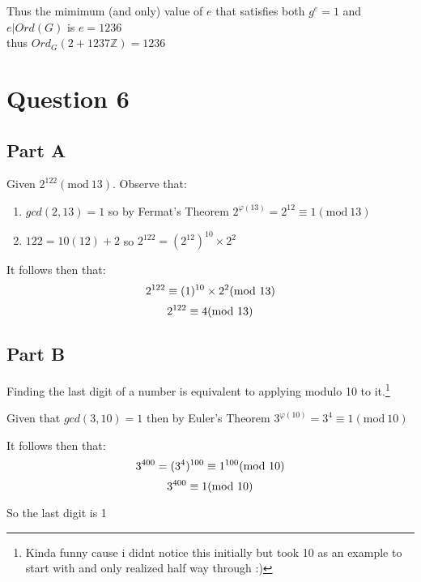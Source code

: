 \documentclass{article}
\numberwithin{equation}{subsection}
\begin{document}
\vspace{10pt}
Thus the mimimum (and only) value of $e$ that satisfies both $g^e=1$ and $e|Ord(G)$ is $e=1236$ \\thus $Ord_G(2+1237\mathbb{Z}) = 1236$ 

\newpage
	\thispagestyle{fancy}


	\section*{Question 6}
	\subsection*{Part A}
	Given $2^{122} (\textrm{mod}\ 13)$. Observe that:
	\begin{enumerate}
	\item $gcd(2, 13) =1$ so by Fermat's Theorem $2^{\varphi(13)} = 2^{12} \equiv 1 (\textrm{mod}\ 13)$
	\item $122 = 10(12) + 2$ \quad so \quad $2^{122} = (2^{12})^{10} \times 2^2$ 
	\end{enumerate}

	\vspace{15pt}
	It follows then that:
	\begin{equation}\notag
		2^{122} \equiv (1)^{10} \times 2^2 (\textrm{mod}\ 13)	
	\end{equation}
	\begin{equation}\notag
		2^{122} \equiv 4(\textrm{mod}\ 13)
	\end{equation}

	\vspace{25pt}
	\subsection*{Part B}
	Finding the last digit of a number is equivalent to applying modulo 10 to it.\footnote{Kinda funny cause i didnt notice this initially
	but took 10 as an example to start with and only realized half way through :)}

	Given that $gcd(3,10) = 1$ then by Euler's Theorem $3^{\varphi(10)}  = 3^4 \equiv 1 (\textrm{mod}\ 10)$

	It follows then that:
	\begin{equation}\notag
		3^{400} = (3^4)^{100} \equiv 1^{100} (\textrm{mod}\ 10)	
	\end{equation}
	\begin{equation}\notag
		3^{400} \equiv 1 (\textrm{mod}\ 10)	
	\end{equation}

	So the last digit is 1
\end{document}
